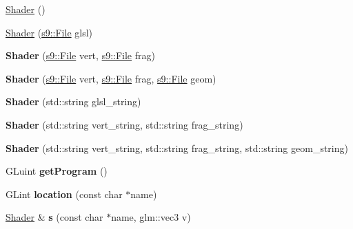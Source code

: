 \begin{DoxyCompactItemize}
\item 
\hyperlink{classs9_1_1gl_1_1Shader_ae78a7518cbf2dace65cdef8d9ed07721}{Shader} ()
\item 
\hyperlink{classs9_1_1gl_1_1Shader_a5639704a27519dd9bba2faf9e3e6af34}{Shader} (\hyperlink{classs9_1_1File}{s9\-::\-File} glsl)
\item 
\hypertarget{classs9_1_1gl_1_1Shader_a8d5ca92954778e90c900141f275d6931}{{\bfseries Shader} (\hyperlink{classs9_1_1File}{s9\-::\-File} vert, \hyperlink{classs9_1_1File}{s9\-::\-File} frag)}\label{classs9_1_1gl_1_1Shader_a8d5ca92954778e90c900141f275d6931}

\item 
\hypertarget{classs9_1_1gl_1_1Shader_a5f12b4e09c98c89b4436954c2327ccd3}{{\bfseries Shader} (\hyperlink{classs9_1_1File}{s9\-::\-File} vert, \hyperlink{classs9_1_1File}{s9\-::\-File} frag, \hyperlink{classs9_1_1File}{s9\-::\-File} geom)}\label{classs9_1_1gl_1_1Shader_a5f12b4e09c98c89b4436954c2327ccd3}

\item 
\hypertarget{classs9_1_1gl_1_1Shader_a30fc9a4b419341c60bb6590f02562040}{{\bfseries Shader} (std\-::string glsl\-\_\-string)}\label{classs9_1_1gl_1_1Shader_a30fc9a4b419341c60bb6590f02562040}

\item 
\hypertarget{classs9_1_1gl_1_1Shader_aee79b4e09b2a40410d668be930c1734f}{{\bfseries Shader} (std\-::string vert\-\_\-string, std\-::string frag\-\_\-string)}\label{classs9_1_1gl_1_1Shader_aee79b4e09b2a40410d668be930c1734f}

\item 
\hypertarget{classs9_1_1gl_1_1Shader_ab447bae4cbc69454ab40533673b096fe}{{\bfseries Shader} (std\-::string vert\-\_\-string, std\-::string frag\-\_\-string, std\-::string geom\-\_\-string)}\label{classs9_1_1gl_1_1Shader_ab447bae4cbc69454ab40533673b096fe}

\item 
\hypertarget{classs9_1_1gl_1_1Shader_a8ae3cdbcf4c492cba50841534a8135c7}{G\-Luint {\bfseries get\-Program} ()}\label{classs9_1_1gl_1_1Shader_a8ae3cdbcf4c492cba50841534a8135c7}

\item 
\hypertarget{classs9_1_1gl_1_1Shader_a9b6dc107bbc1715e937e577e9e11ec11}{G\-Lint {\bfseries location} (const char $\ast$name)}\label{classs9_1_1gl_1_1Shader_a9b6dc107bbc1715e937e577e9e11ec11}

\item 
\hypertarget{classs9_1_1gl_1_1Shader_a63ec6fd47885a61249bd498132e2ae7e}{\hyperlink{classs9_1_1gl_1_1Shader}{Shader} \& {\bfseries s} (const char $\ast$name, glm\-::vec3 v)}\label{classs9_1_1gl_1_1Shader_a63ec6fd47885a61249bd498132e2ae7e}


\end{DoxyCompactItemize}
